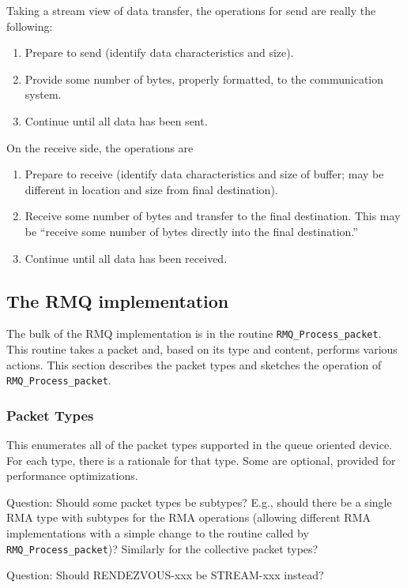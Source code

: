 \documentclass{article}
\let\code=\texttt
\begin{document}
Taking a stream view of data transfer, the operations for send are really the
following:
\begin{enumerate}
\item Prepare to send (identify data characteristics and size).
\item Provide some number of bytes, properly formatted, to the communication
  system.
\item Continue until all data has been sent.
\end{enumerate}
On the receive side, the operations are
\begin{enumerate}
\item Prepare to receive (identify data characteristics and size of buffer;
  may be different in location and size from final destination).
\item Receive some number of bytes and transfer to the final destination.
  This may be ``receive some number of bytes directly into the final
  destination.'' 
\item Continue until all data has been received.
\end{enumerate}

\subsection{The RMQ implementation}
The bulk of the RMQ implementation is in the routine
\code{RMQ\_Process\_packet}.  This routine takes a packet and, based on its
type and content, performs various actions.  This section describes the packet
types and sketches the operation of \code{RMQ\_Process\_packet}.

\subsubsection{Packet Types}
This enumerates all of the packet types supported in the queue oriented
device.  For each type, there is a rationale for that type.  Some are
optional, provided for performance optimizations.

Question:  Should some packet types be subtypes?  E.g., should there be a
single RMA type with subtypes for the RMA operations (allowing different RMA
implementations with a simple change to the routine called by 
\code{RMQ\_Process\_packet})? Similarly for the collective packet types?

Question: Should RENDEZVOUS-xxx be STREAM-xxx instead?
\end{document}
